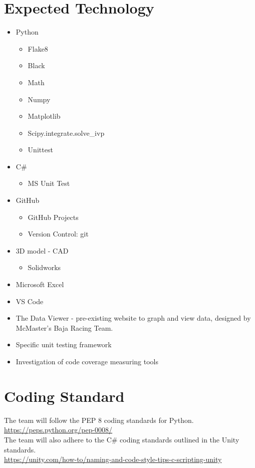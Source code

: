 \documentclass{article}
\begin{document}
\section{Expected Technology}

\begin{itemize}
\item Python
\begin{itemize}
  \item Flake8
  \item Black
  \item Math
  \item Numpy
  \item Matplotlib
  \item Scipy.integrate.solve\_ivp
  \item Unittest
\end{itemize}
\item C\#
\begin{itemize}
  \item MS Unit Test
\end{itemize}
\item GitHub
\begin{itemize}
  \item GitHub Projects
  \item Version Control: git
\end{itemize}
\item 3D model - CAD
\begin{itemize}
  \item Solidworks
\end{itemize}
\item Microsoft Excel
\item VS Code
\item The Data Viewer - pre-existing website to graph and view data, designed by McMaster's Baja Racing Team.
\item Specific unit testing framework
\item Investigation of code coverage measuring tools
\end{itemize}

\section{Coding Standard}

The team will follow the PEP 8 coding standards for Python.
\\
\url{https://peps.python.org/pep-0008/}
\\
\noindent The team will also adhere to the C\# coding standards outlined in the Unity standards.
\\
\url{https://unity.com/how-to/naming-and-code-style-tips-c-scripting-unity}
\end{document}
